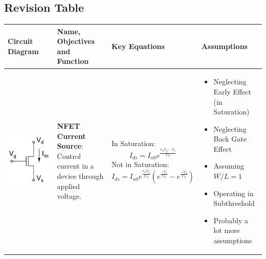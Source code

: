 \subsection{Revision Table}
\hspace{-3cm}
\begin{table}[h!]
  \centering
  \begin{tabular}{ | m{4cm} | m{4cm} | m{5cm} | m{4cm} | }
    \hline
    \textbf{Circuit Diagram} & \textbf{Name, Objectives and Function} & \textbf{Key Equations} & \textbf{Assumptions} \\ 
    \hline
    \center \includegraphics[width=0.7\linewidth]{Figures/N_FET_Current_Source.PNG}
    &
    \textbf{NFET Current Source}: \newline Control current in a device through applied voltage.
    &
    \centering In Saturation: \newline \newline \begin{equation*}I_{ds} =  I_{n0} e^{\frac{\kappa_{n}V_g - V_s}{U_T}}\end{equation*} \newline \newline
    \centering Not in Saturation: \newline \newline \begin{equation*}I_{ds} = I_{n0} e^{\frac{\kappa_{n}V_g}{U_T}}(e^\frac{-V_s}{U_T} - e^\frac{-V_d}{U_T})\end{equation*}
    & 
    \begin{itemize}
        \item Neglecting Early Effect (in Saturation)
        \item Neglecting Back Gate Effect
        \item Assuming $W/L = 1$
        \item Operating in Subthreshold
        \item Probably a lot more assumptions 
    \end{itemize}
    

\end{tabular}
\end{table}
